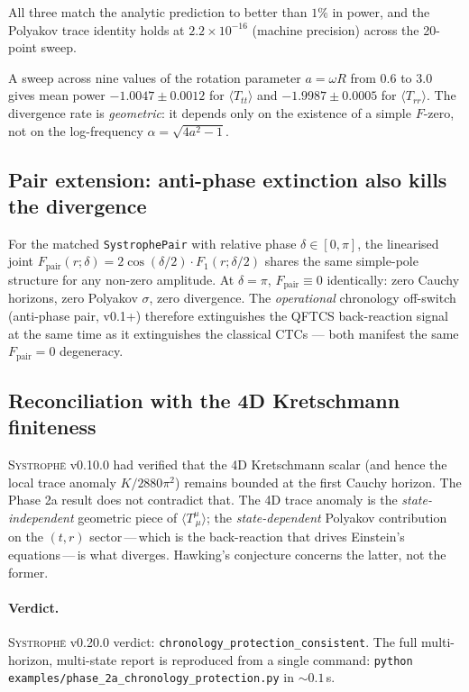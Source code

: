 \documentclass[11pt,a4paper]{article}
\begin{document}
All three match the analytic prediction to better than $1\%$ in
power, and the Polyakov trace identity holds at $2.2 \times 10^{-16}$
(machine precision) across the 20-point sweep.

A sweep across nine values of the rotation parameter $a = \omega R$
from $0.6$ to $3.0$ gives mean power $-1.0047 \pm 0.0012$ for
$\langle T_{tt} \rangle$ and $-1.9987 \pm 0.0005$ for
$\langle T_{rr} \rangle$. The divergence rate is \emph{geometric}:
it depends only on the existence of a simple $F$-zero, not on the
log-frequency $\alpha = \sqrt{4a^2 - 1}$.

\subsection{Pair extension: anti-phase extinction also kills the divergence}

For the matched \texttt{SystrophePair} with relative phase
$\delta \in [0, \pi]$, the linearised joint
$F_{\text{pair}}(r; \delta) = 2 \cos(\delta/2) \cdot F_1(r;\delta/2)$
shares the same simple-pole structure for any non-zero amplitude. At
$\delta = \pi$, $F_{\text{pair}} \equiv 0$ identically: zero Cauchy
horizons, zero Polyakov $\sigma$, zero divergence. The
\emph{operational} chronology off-switch (anti-phase pair, v0.1+)
therefore extinguishes the QFTCS back-reaction signal at the same
time as it extinguishes the classical CTCs --- both manifest the same
$F_{\text{pair}} = 0$ degeneracy.

\subsection{Reconciliation with the 4D Kretschmann finiteness}

\textsc{Systroph\=e} v0.10.0 had verified that the 4D Kretschmann
scalar (and hence the local trace anomaly $K / 2880 \pi^2$) remains
bounded at the first Cauchy horizon. The Phase 2a result does not
contradict that. The 4D trace anomaly is the \emph{state-independent}
geometric piece of $\langle T^\mu_{~\mu} \rangle$; the
\emph{state-dependent} Polyakov contribution on the $(t, r)$
sector\,---\,which is the back-reaction that drives Einstein's
equations\,---\,is what diverges. Hawking's conjecture concerns the
latter, not the former.

\paragraph{Verdict.} \textsc{Systroph\=e} v0.20.0 verdict:
\texttt{chronology\_protection\_consistent}. The full multi-horizon,
multi-state report is reproduced from a single command:
\verb|python examples/phase_2a_chronology_protection.py| in $\sim 0.1$\,s.
\end{document}
